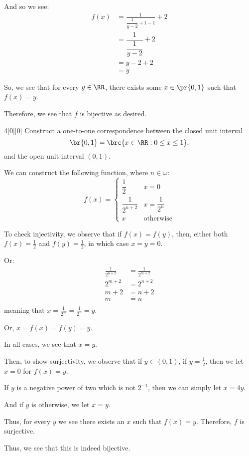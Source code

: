 \documentclass{article}
\begin{document}
\begin{solution}
	And so we see:
	\begin{align*}
		f(x) &= \frac{1}{\dfrac{1}{y-2} +1 - 1} + 2 \\
		&= \dfrac{1}{\dfrac{1}{y-2}} + 2 \\
		&= y - 2 + 2 \\
		&= y
	\end{align*}

	So, we see that for every $y \in \RR$, there exists some $x \in \pr{0,1}$ such that $f(x) = y$.
	
	Therefore, we see that $f$ is bijective as desired. 
\end{solution}

\begin{hw}{4}[0][0]
	Construct a one-to-one correspondence between the closed unit interval
	\begin{equation*}
		\br{0,1} = \brc{x \in \RR : 0 \leq x \leq 1},
	\end{equation*}
	and the open unit interval $(0,1)$.
\end{hw}
\begin{solution}
	We can construct the following function, where $n \in \omega$:
	\begin{equation*}
		f(x) = \begin{cases}
			\dfrac{1}{2} & x = 0 \\
			\dfrac{1}{2^{n+2}} & x = \dfrac{1}{2^{n}} \\
			x & \text{otherwise}
		\end{cases}
	\end{equation*}
	
	To check injectivity, we observe that if $f(x) = f(y)$, then, either both $f(x) = \frac{1}{2}$ and $f(y) = \frac{1}{2}$, in which case $x = y = 0$.

	Or:
	\begin{align*}
		\frac{1}{2^{n+2}} &= \frac{1}{2^{m+2}} \\
		2^{m+2} &= 2^{n+2} \\
		m+2 &= n+2 \\
		m &= n \\
	\end{align*}
	meaning that $x = \frac{1}{2^{m}} = \frac{1}{2^{n}} = y$.

	Or, $x = f(x) = f(y) = y$. 

	In all cases, we see that $x = y$.
	
	Then, to show surjectivity, we observe that if $y \in (0,1)$, if $y = \frac{1}{2}$, then we let $x = 0$ for $f(x) = y$.
	
	If $y$ is a negative power of two which is not $2^{-1}$, then we can simply let $x = 4y$.
	
	And if $y$ is otherwise, we let $x = y$.
	
	Thus, for every $y$ we see there exists an $x$ such that $f(x) = y$. Therefore, $f$ is surjective.

	Thus, we see that this is indeed bijective. 
\end{solution}
\end{document}
